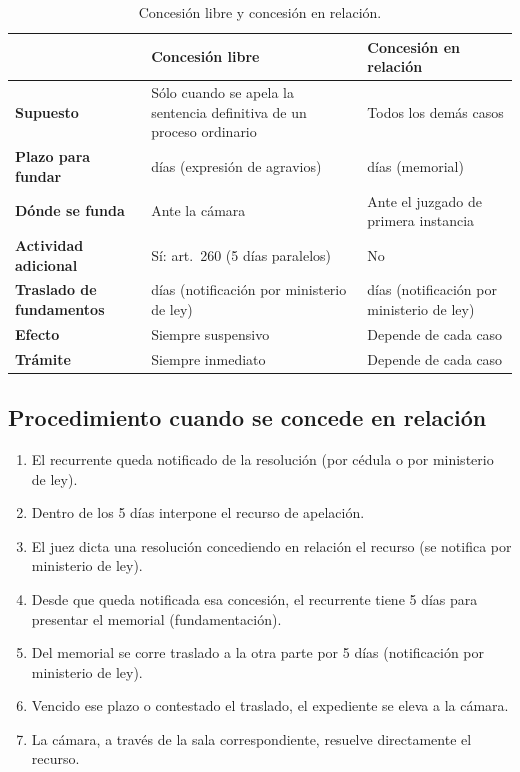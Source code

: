 \documentclass[12pt,oneside]{book}
\begin{document}
\begin{table}[H]
\centering
\begin{tabularx}{\textwidth}{
    >{\raggedright\arraybackslash}p{}
    >{\raggedright\arraybackslash}X
    >{\raggedright\arraybackslash}X
}
\toprule
 & \textbf{Concesión libre} & \textbf{Concesión en relación} \\
\midrule
\textbf{Supuesto} & Sólo cuando se apela la sentencia definitiva de un proceso ordinario & Todos los demás casos \\
\addlinespace
\textbf{Plazo para fundar} & 10 días (expresión de agravios) & 5 días (memorial) \\
\addlinespace
\textbf{Dónde se funda} & Ante la cámara & Ante el juzgado de primera instancia \\
\addlinespace
\textbf{Actividad adicional} & Sí: art.~260 (5 días paralelos) & No \\
\addlinespace
\textbf{Traslado de fundamentos} & 10 días (notificación por ministerio de ley) & 5 días (notificación por ministerio de ley) \\
\addlinespace
\textbf{Efecto} & Siempre suspensivo & Depende de cada caso \\
\addlinespace
\textbf{Trámite} & Siempre inmediato & Depende de cada caso \\
\bottomrule
\end{tabularx}
\caption{Concesión libre y concesión en relación.}
\end{table}

\subsection{Procedimiento cuando se concede en relación}

\begin{enumerate}
    \item El recurrente queda notificado de la resolución (por cédula o por ministerio de ley).
    \item Dentro de los 5 días interpone el recurso de apelación.
    \item El juez dicta una resolución concediendo en relación el recurso (se notifica por ministerio de ley).
    \item Desde que queda notificada esa concesión, el recurrente tiene 5 días para presentar el memorial (fundamentación).
    \item Del memorial se corre traslado a la otra parte por 5 días (notificación por ministerio de ley).
    \item Vencido ese plazo o contestado el traslado, el expediente se eleva a la cámara.
    \item La cámara, a través de la sala correspondiente, resuelve directamente el recurso.
\end{enumerate}
\end{document}
